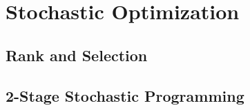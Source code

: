 

\part{Stochastic Optimization}
	\chapter{Rank and Selection}

	\chapter{2-Stage Stochastic Programming}
